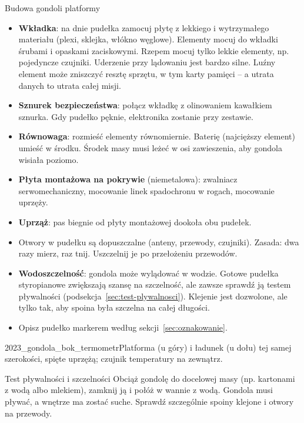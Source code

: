 \begin{podsekcja}{Budowa gondoli platformy}
\begin{itemize}
  \item \textbf{Wkładka}: na dnie pudełka zamocuj płytę z lekkiego i wytrzymałego materiału (plexi, sklejka, włókno węglowe). Elementy mocuj do wkładki śrubami i opaskami zaciskowymi. Rzepem mocuj tylko lekkie elementy, np. pojedyncze czujniki. Uderzenie przy lądowaniu jest bardzo silne. Luźny element może zniszczyć resztę sprzętu, w tym karty pamięci -- a utrata danych to utrata całej misji.
  \item \textbf{Sznurek bezpieczeństwa}: połącz wkładkę z olinowaniem kawałkiem sznurka. Gdy pudełko pęknie, elektronika zostanie przy zestawie.
  \item \textbf{Równowaga}: rozmieść elementy równomiernie. Baterię (najcięższy element) umieść w środku. Środek masy musi leżeć w osi zawieszenia, aby gondola wisiała poziomo.
  \item \textbf{Płyta montażowa na pokrywie} (niemetalowa): zwalniacz serwomechaniczny, mocowanie linek spadochronu w rogach, mocowanie uprzęży.
  \item \textbf{Uprząż}: pas biegnie od płyty montażowej dookoła obu pudełek.
  \item Otwory w pudełku są dopuszczalne (anteny, przewody, czujniki). Zasada: dwa razy mierz, raz tnij. Uszczelnij je po przełożeniu przewodów.
  \item \textbf{Wodoszczelność}: gondola może wylądować w wodzie. Gotowe pudełka styropianowe zwiększają szansę na szczelność, ale zawsze sprawdź ją testem pływalności (podsekcja~\ref{sec:test-plywalnosci}). Klejenie jest dozwolone, ale tylko tak, aby spoina była szczelna na całej długości.
  \item Opisz pudełko markerem według sekcji~\ref{sec:oznakowanie}.
\end{itemize}

{2023_gondola_bok_termometr}{Platforma (u góry) i ładunek (u dołu) tej samej szerokości, spięte uprzężą; czujnik temperatury na zewnątrz.}
\end{podsekcja}

\begin{podsekcja}{Test pływalności i szczelności}\label{sec:test-plywalnosci}
Obciąż gondolę do docelowej masy (np. kartonami z wodą albo mlekiem), zamknij ją i połóż w wannie z wodą. Gondola musi pływać, a wnętrze ma zostać suche. Sprawdź szczególnie spoiny klejone i otwory na przewody.
\end{podsekcja}

